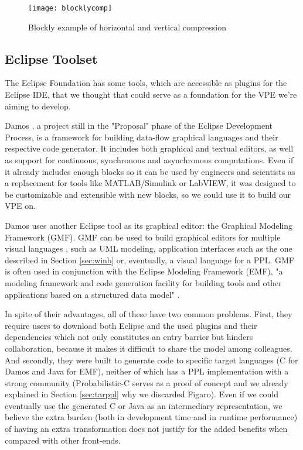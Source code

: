 \begin{figure}[!htpb]
  \begin{center}
    \leavevmode
    \texttt{[image: blocklycomp]}
    \caption{Blockly example of horizontal and vertical compression \cite{blockly}}
    \label{fig:blocklycomp}
  \end{center}
\end{figure}

\subsection{Eclipse Toolset}

The Eclipse Foundation has some tools, which are accessible as plugins for the
Eclipse IDE, that we thought that could serve as a foundation for the VPE we're
aiming to develop.

Damos \cite{damos}, a project still in the "Proposal" phase of the Eclipse
Development Process, is a framework for building data-flow graphical languages
and their respective code generator. It includes both graphical and textual editors,
as well as support for continuous, synchronous and asynchronous computations.
Even if it already includes enough blocks so it can be used by engineers and scientists
as a replacement for tools like MATLAB/Simulink or LabVIEW, it was designed to
be customizable and extensible with new blocks, so we could use it to build our VPE on.

Damos uses another Eclipse tool as its graphical editor: the Graphical Modeling
Framework (GMF). GMF can be used to build graphical editors for multiple visual
languages \cite{gmf}, such as UML modeling, application interfaces such as the
one described in Section \ref{sec:winb} or, eventually, a visual language for a
PPL. GMF is often used in conjunction with the Eclipse Modeling Framework (EMF),
"a modeling framework and code generation facility for building tools and other
applications based on a structured data model" \cite{emf}.

In spite of their advantages, all of these have two common problems. First, they require
users to download both Eclipse and the used plugins and their dependencies
which not only constitutes an entry barrier but hinders collaboration, because
it makes it difficult to share the model among colleagues. And secondly, they
were built to generate code to specific target languages (C for Damos and Java
for EMF), neither of which has a PPL implementation with a strong community
(Probabilistic-C \cite{Paige2014} serves as a proof of concept and we already explained
in Section \ref{sec:tarppl} why we discarded Figaro). Even if we could eventually
use the generated C or Java as an intermediary representation, we believe the
extra burden (both in development time and in runtime performance) of having an
extra transformation does not justify for the added benefits when compared with
other front-ends.

